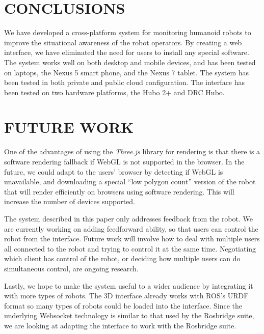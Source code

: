 \documentclass[letterpaper, 10 pt, conference]{ieee/ieeeconf}  %
\begin{document}
\section{CONCLUSIONS}
We have developed a cross-platform system for monitoring humanoid robots to improve the situational awareness of the robot operators.
By creating a web interface, we have eliminated the need for users to install any special software.
The system works well on both desktop and mobile devices, and has been tested on laptops, the Nexus 5 smart phone, and the Nexus 7 tablet.
The system has been tested in both private and public cloud configuration.
The interface has been tested on two hardware platforms, the Hubo 2+ and DRC Hubo.

\section{FUTURE WORK}
One of the advantages of using the \textit{Three.js} library for rendering is that there is a software rendering fallback if WebGL is not supported in the browser.
In the future, we could adapt to the users' browser by detecting if WebGL is unavailable, and downloading a special ``low polygon count'' version of the robot that will render efficiently on browsers using software rendering.
This will increase the number of devices supported.

The system described in this paper only addresses feedback from the robot.
We are currently working on adding feedforward ability, so that users can control the robot from the interface.
Future work will involve how to deal with multiple users all connected to the robot and trying to control it at the same time.
Negotiating which client has control of the robot, or deciding how multiple users can do simultaneous control, are ongoing research.

Lastly, we hope to make the system useful to a wider audience by integrating it with more types of robots.
The 3D interface already works with ROS's URDF format so many types of robots could be loaded into the interface.
Since the underlying Websocket technology is similar to that used by the Rosbridge suite, we are looking at adapting the interface to work with the Rosbridge suite.




\end{document}
